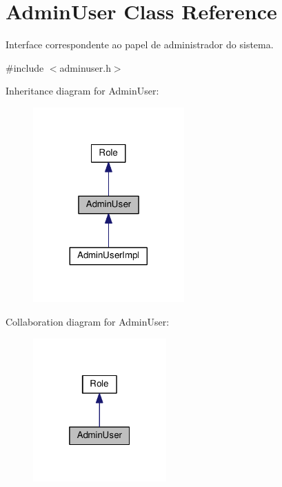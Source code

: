 \hypertarget{classAdminUser}{}\section{Admin\+User Class Reference}
\label{classAdminUser}


Interface correspondente ao papel de administrador do sistema.  




{\ttfamily \#include $<$adminuser.\+h$>$}



Inheritance diagram for Admin\+User\+:
\nopagebreak
\begin{figure}[H]
\begin{center}
\leavevmode
\includegraphics[width=164pt]{d1/d65/classAdminUser__inherit__graph}
\end{center}
\end{figure}


Collaboration diagram for Admin\+User\+:
\nopagebreak
\begin{figure}[H]
\begin{center}
\leavevmode
\includegraphics[width=145pt]{d4/d52/classAdminUser__coll__graph}
\end{center}
\end{figure}
